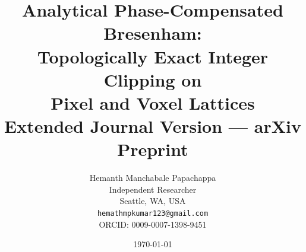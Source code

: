 \documentclass[12pt,a4paper]{article}
\theoremstyle{definition}
\begin{document}
\title{\textbf{Analytical Phase-Compensated Bresenham:\\
Topologically Exact Integer Clipping on\\
Pixel and Voxel Lattices}\\[6pt]
{\large Extended Journal Version --- arXiv Preprint}}

\author{Hemanth Manchabale Papachappa\\
Independent Researcher\\
Seattle, WA, USA\\
\texttt{hemathmpkumar123@gmail.com}\\
ORCID: 0009-0007-1398-9451}

\date{\today}
\maketitle
\thispagestyle{empty}
\end{document}
